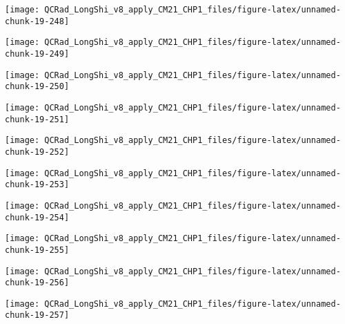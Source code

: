 \documentclass[
  10pt,
  a4paper,oneside]{article}
\begin{document}
\begin{center}\texttt{[image: QCRad\_LongShi\_v8\_apply\_CM21\_CHP1\_files/figure-latex/unnamed-chunk-19-248]} \end{center}

\begin{center}\texttt{[image: QCRad\_LongShi\_v8\_apply\_CM21\_CHP1\_files/figure-latex/unnamed-chunk-19-249]} \end{center}

\begin{center}\texttt{[image: QCRad\_LongShi\_v8\_apply\_CM21\_CHP1\_files/figure-latex/unnamed-chunk-19-250]} \end{center}

\begin{center}\texttt{[image: QCRad\_LongShi\_v8\_apply\_CM21\_CHP1\_files/figure-latex/unnamed-chunk-19-251]} \end{center}

\begin{center}\texttt{[image: QCRad\_LongShi\_v8\_apply\_CM21\_CHP1\_files/figure-latex/unnamed-chunk-19-252]} \end{center}

\begin{center}\texttt{[image: QCRad\_LongShi\_v8\_apply\_CM21\_CHP1\_files/figure-latex/unnamed-chunk-19-253]} \end{center}

\begin{center}\texttt{[image: QCRad\_LongShi\_v8\_apply\_CM21\_CHP1\_files/figure-latex/unnamed-chunk-19-254]} \end{center}

\begin{center}\texttt{[image: QCRad\_LongShi\_v8\_apply\_CM21\_CHP1\_files/figure-latex/unnamed-chunk-19-255]} \end{center}

\begin{center}\texttt{[image: QCRad\_LongShi\_v8\_apply\_CM21\_CHP1\_files/figure-latex/unnamed-chunk-19-256]} \end{center}

\begin{center}\texttt{[image: QCRad\_LongShi\_v8\_apply\_CM21\_CHP1\_files/figure-latex/unnamed-chunk-19-257]} \end{center}
\end{document}
